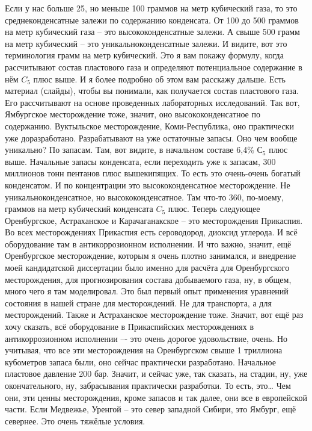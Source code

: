 \documentclass[main.tex]{subfiles}
\begin{document}
Если у нас больше 25, но меньше 100 граммов на метр кубический газа, то это среднеконденсатные залежи по содержанию конденсата.
От 100 до 500 граммов на метр кубический газа -- это высококонденсатные залежи.
А свыше 500 грамм на метр кубический -- это уникальноконденсатные залежи.
И видите, вот это терминология грамм на метр кубический.
Это я вам покажу формулу, когда рассчитывают состав пластового газа и определяют потенциальное содержание в нём $C_5$ плюс выше.
И я более подробно об этом вам расскажу дальше.
Есть материал (слайды), чтобы вы понимали, как получается состав пластового газа.
Его рассчитывают на основе проведенных лабораторных исследований.
Так вот, Ямбургское месторождение тоже, значит, оно высококонденсатное по содержанию.
Вуктыльское месторождение, Коми-Республика, оно практически уже доразработано.
Разрабатывают на уже остаточные запасы.
Оно чем вообще уникально?
По запасам.
Там, вот видите, в начальном составе 6,4\% $С_5$ плюс выше.
Начальные запасы конденсата, если переходить уже к запасам, 300 миллионов тонн пентанов плюс вышекипящих.
То есть это очень-очень богатый конденсатом.
И по концентрации это высококонденсатное месторождение.
Не уникальноконденсатное, но высококонденсатное.
Там что-то 360, по-моему, граммов на метр кубический конденсата $C_5$ плюс.
Теперь следующее Оренбургское, Астраханское и Карачаганакское -- это месторождения Прикаспия.
Во всех месторождениях Прикаспия есть сероводород, диоксид углерода.
И всё оборудование там в антикоррозионном исполнении.
И что важно, значит, ещё Оренбургское месторождение, которым я очень плотно занимался, и внедрение моей кандидатской диссертации было именно для расчёта для Оренбургского месторождения, для прогнозирования состава добываемого газа, ну, в общем, много чего я там моделировал.
Это был первый опыт применения уравнений состояния в нашей стране для месторождений.
Не для транспорта, а для месторождений.
Также и Астраханское месторождение тоже.
Значит, вот ещё раз хочу сказать, всё оборудование в Прикаспийских месторождениях в антикоррозионном исполнении –- это очень дорогое удовольствие, очень.
Но учитывая, что все эти месторождения на Оренбургском свыше 1 триллиона кубометров запаса были, оно сейчас практически разработано.
Начальное пластовое давление 200 бар.
Значит, и сейчас уже, так сказать, на стадии, ну, уже окончательного, ну, забрасывания практически разработки.
То есть, это… Чем они, эти ценны месторождения, кроме запасов и так далее, они все в европейской части.
Если Медвежье, Уренгой – это север западной Сибири, это Ямбург, ещё севернее.
Это очень тяжёлые условия.
\end{document}
